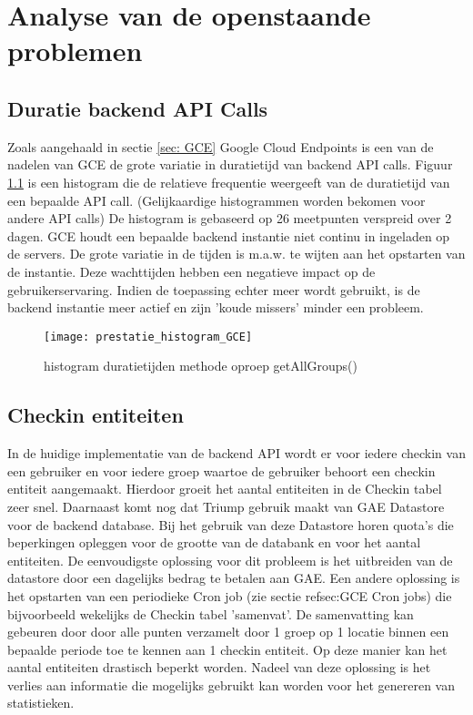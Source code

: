 
\chapter{Analyse van de openstaande problemen}%

\section{Duratie backend API Calls}

Zoals aangehaald in sectie \ref{sec: GCE} Google Cloud Endpoints is een van de nadelen van GCE de grote variatie in duratietijd van backend API calls. Figuur \ref{fig:hist_getAllGroups} is een histogram die de relatieve frequentie weergeeft van de duratietijd van een bepaalde API call. (Gelijkaardige histogrammen worden bekomen voor andere API calls) De histogram is gebaseerd op 26 meetpunten verspreid over 2 dagen. GCE houdt een bepaalde backend instantie niet continu in ingeladen op de servers. De grote variatie in de tijden is m.a.w. te wijten aan het opstarten van de instantie. Deze wachttijden hebben een negatieve impact op de gebruikerservaring. Indien de toepassing echter meer wordt gebruikt, is de backend instantie meer actief en zijn 'koude missers' minder een probleem.
\begin{figure}[H]
	\centering
	\texttt{[image: prestatie\_histogram\_GCE]}
	\caption{histogram duratietijden methode oproep getAllGroups()}
	\label{fig:hist_getAllGroups}
\end{figure}


\section{Checkin entiteiten}

In de huidige implementatie van de backend API wordt er voor iedere checkin van een gebruiker en voor iedere groep waartoe de gebruiker behoort een checkin entiteit aangemaakt. Hierdoor groeit het aantal entiteiten in de Checkin tabel zeer snel. Daarnaast komt nog dat Triump gebruik maakt van GAE Datastore voor de backend database. Bij het gebruik van deze Datastore horen quota's die beperkingen opleggen voor de grootte van de databank en voor het aantal entiteiten. 
De eenvoudigste oplossing voor dit probleem is het uitbreiden van de datastore door een dagelijks bedrag te betalen aan GAE. Een andere oplossing is het opstarten van een periodieke Cron job (zie sectie ref{sec:GCE} Cron jobs) die bijvoorbeeld wekelijks de Checkin tabel 'samenvat'. De samenvatting kan gebeuren door door alle punten verzamelt door 1 groep op 1 locatie binnen een bepaalde periode toe te kennen aan 1 checkin entiteit. Op deze manier kan het aantal entiteiten drastisch beperkt worden. Nadeel van deze oplossing is het verlies aan informatie die mogelijks gebruikt kan worden voor het genereren van statistieken. 

